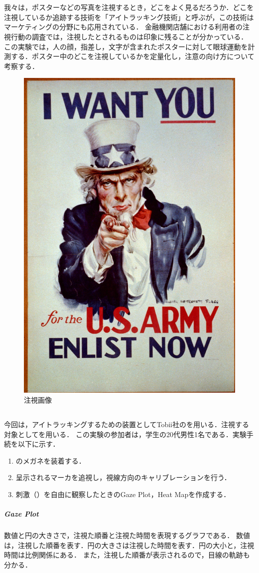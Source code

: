 \chapter{\kadaid}
\section{\purpose}
我々は，ポスターなどの写真を注視するとき，どこをよく見るだろうか．どこを注視しているか追跡する技術を「アイトラッキング技術」と呼ぶが，この技術はマーケティングの分野にも応用されている．
金融機関店舗における利用者の注視行動の調査\cite{アイトラッキング技術を用いた地域実践的研究の報告}では，注視したとされるものは印象に残ることが分かっている．
この実験では，人の顔，指差し，文字が含まれたポスターに対して眼球運動を計測する．ポスター中のどこを注視しているかを定量化し，注意の向け方について考察する．

\begin{figure}
    \centering
    \includegraphics[keepaspectratio,width=.15\textwidth]{../../12_DataAnalysis/snapshot.jpg}
    \caption{注視画像}
    \label{fig:注視画像}
    \vspace{-1.5cm}
\end{figure}
\section{\method}
今回は，アイトラッキングするための装置としてTobii社の\tobi を用いる．注視する対象としてを用いる．
この実験の参加者は，学生の20代男性1名である．実験手続を以下に示す．
\begin{enumerate}
    \renewcommand{\labelenumi}{\fbox{\theenumi}}
    \item \tobi のメガネを装着する．
    \item 呈示されるマーカを追視し，視線方向のキャリブレーションを行う．
    \item 刺激（）を自由に観察したときのGaze Plot，Heat Mapを作成する．
\end{enumerate}
\paragraph{Gaze Plot}
数値と円の大きさで，注視た順番と注視た時間を表現するグラフである．
数値は，注視した順番を表す．円の大きさは注視した時間を表す．円の大小と，注視時間は比例関係にある．
また，注視した順番が表示されるので，目線の軌跡も分かる．

